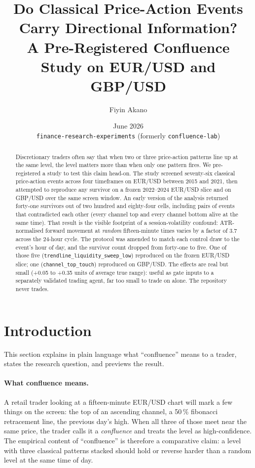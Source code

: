 \documentclass[11pt,a4paper]{article}
\title{Do Classical Price-Action Events Carry Directional Information?\\
A Pre-Registered Confluence Study on EUR/USD and GBP/USD}
\author{Fiyin Akano}
\date{June 2026 \\ \small \texttt{finance-research-experiments} (formerly \texttt{confluence-lab})}
\begin{document}
\maketitle

\begin{abstract}
Discretionary traders often say that when two or three price-action
patterns line up at the same level, the level matters more than when only
one pattern fires. We pre-registered a study to test this claim
head-on. The study screened seventy-six classical price-action events
across four timeframes on EUR/USD between 2015 and 2021, then attempted
to reproduce any survivor on a frozen 2022--2024 EUR/USD slice and on
GBP/USD over the same screen window. An early version of the analysis
returned forty-one survivors out of two hundred and eighty-four cells,
including pairs of events that contradicted each other (every channel
top and every channel bottom alive at the same time). That result is
the visible footprint of a session-volatility confound: ATR-normalised
forward movement at \emph{random} fifteen-minute times varies by a
factor of 3.7 across the 24-hour cycle. The protocol was amended to
match each control draw to the event's hour of day, and the survivor
count dropped from forty-one to five. One of those five
(\texttt{trendline\_liquidity\_sweep\_low}) reproduced on the frozen
EUR/USD slice; one (\texttt{channel\_top\_touch}) reproduced on
GBP/USD. The effects are real but small (+0.05 to +0.35 units of
average true range): useful as gate inputs to a separately validated
trading agent, far too small to trade on alone. The repository never
trades.
\end{abstract}

\section{Introduction}\label{sec:intro}

This section explains in plain language what \enquote{confluence} means
to a trader, states the research question, and previews the result.

\paragraph{What confluence means.} A retail trader looking at a
fifteen-minute EUR/USD chart will mark a few things on the screen: the
top of an ascending channel, a 50\,\% fibonacci retracement line, the
previous day's high. When all three of those meet near the same price,
the trader calls it a \emph{confluence} and treats the level as
high-confidence. The empirical content of \enquote{confluence} is
therefore a comparative claim: a level with three classical patterns
stacked should hold or reverse harder than a random level at the same
time of day.
\end{document}
